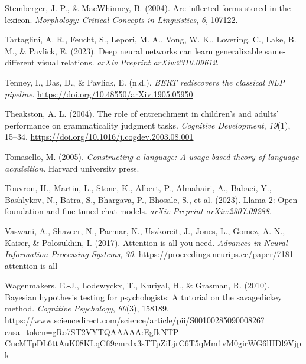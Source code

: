 \documentclass[
  12pt,
  letterpaper,
]{scrreprt}
\newlength{\cslhangindent}
\newenvironment{CSLReferences}[2] %
 {\begin{list}{}{%
  \setlength{\itemindent}{0pt}
  \setlength{\leftmargin}{0pt}
  \setlength{\parsep}{0pt}
  \ifodd #1
   \setlength{\leftmargin}{\cslhangindent}
   \setlength{\itemindent}{-1\cslhangindent}
  \fi
  \setlength{\itemsep}{#2\baselineskip}}}
 {\end{list}}
\begin{document}
\begin{CSLReferences}{1}{0}
Stemberger, J. P., \& MacWhinney, B. (2004). Are inflected forms stored
in the lexicon. \emph{Morphology: Critical Concepts in Linguistics},
\emph{6}, 107122.

Tartaglini, A. R., Feucht, S., Lepori, M. A., Vong, W. K., Lovering, C.,
Lake, B. M., \& Pavlick, E. (2023). Deep neural networks can learn
generalizable same-different visual relations. \emph{arXiv Preprint
arXiv:2310.09612}.

Tenney, I., Das, D., \& Pavlick, E. (n.d.). \emph{BERT rediscovers the
classical NLP pipeline}. \url{https://doi.org/10.48550/arXiv.1905.05950}

Theakston, A. L. (2004). The role of entrenchment in children{'}s and
adults{'} performance on grammaticality judgment tasks. \emph{Cognitive
Development}, \emph{19}(1), 15--34.
\url{https://doi.org/10.1016/j.cogdev.2003.08.001}

Tomasello, M. (2005). \emph{Constructing a language: A usage-based
theory of language acquisition}. Harvard university press.

Touvron, H., Martin, L., Stone, K., Albert, P., Almahairi, A., Babaei,
Y., Bashlykov, N., Batra, S., Bhargava, P., Bhosale, S., et al. (2023).
Llama 2: Open foundation and fine-tuned chat models. \emph{arXiv
Preprint arXiv:2307.09288}.

Vaswani, A., Shazeer, N., Parmar, N., Uszkoreit, J., Jones, L., Gomez,
A. N., Kaiser, \& Polosukhin, I. (2017). Attention is all you need.
\emph{Advances in Neural Information Processing Systems}, \emph{30}.
\url{https://proceedings.neurips.cc/paper/7181-attention-is-all}

Wagenmakers, E.-J., Lodewyckx, T., Kuriyal, H., \& Grasman, R. (2010).
Bayesian hypothesis testing for psychologists: A tutorial on the
savage{\textendash}dickey method. \emph{Cognitive Psychology},
\emph{60}(3), 158189.
\url{https://www.sciencedirect.com/science/article/pii/S0010028509000826?casa_token=gRo7ST2VYTQAAAAA:EgIkNTP-CucMTpDL6ttAuK08KLqCfi9cmrdx3sTTpZiLjrC6T5qMm1vM0girWG6lHDl9Vjpk}


\end{CSLReferences}
\end{document}
